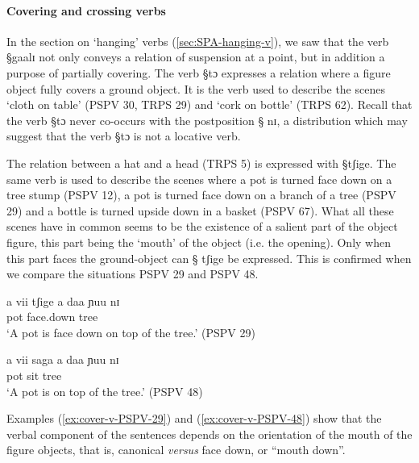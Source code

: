 \paragraph{Covering and crossing verbs}
\label{sec:SPA-cover-v}

In the section on `hanging' verbs (\ref{sec:SPA-hanging-v}), we saw that the
verb {\S gaalɪ} not only conveys a relation of suspension at a point, but in
addition a purpose of  partially covering. The verb {\S tɔ} expresses a
relation where a figure object  fully covers a ground object. It is the verb
used
to describe the scenes `cloth on table' (PSPV 30, TRPS 29) and `cork on bottle'
(TRPS
62). Recall that the verb {\S tɔ} never co-occurs with the postposition {\S
nɪ},  a distribution  which may suggest that the verb {\S tɔ} is not a locative
verb.

The relation between a hat and a head (TRPS 5) is expressed with  {\S  tʃige}.
The same verb is used to describe the scenes where  a pot is turned face down
on  a tree stump (PSPV 12),   a pot is turned face down
on  a branch of a tree (PSPV 29) and a bottle is turned upside down in a basket
(PSPV 67). What all these scenes have in common seems to be the existence of a
salient part of the object figure, this part being the `mouth' of the object
(i.e. the opening).  Only when  this part faces the ground-object can {\S 
tʃige} be expressed. This is confirmed when we compare the situations PSPV 29
and PSPV 48.

\begin{exe}
\ex\label{ex:cover-v}
 \begin{xlist}
  \ex\label{ex:cover-v-PSPV-29}
\gll  a vii tʃige a daa ɲuu nɪ\\
{\art}  pot face.down {\art} tree {\reln}  {\postp} \\
\glt `A pot is face down on top of the tree.' (PSPV 29)

 \ex\label{ex:cover-v-PSPV-48}
\gll a vii saga a daa ɲuu nɪ \\
{\art}  pot sit {\art} tree {\reln}  {\postp} \\ 
\glt `A pot is on top of the tree.' (PSPV 48)
 \end{xlist}
\end{exe}

Examples (\ref{ex:cover-v-PSPV-29})  and (\ref{ex:cover-v-PSPV-48})  show that
the verbal component of the sentences depends on the orientation of the mouth of
the figure objects,
that is, canonical {\it versus} face down, or ``mouth down''. 


